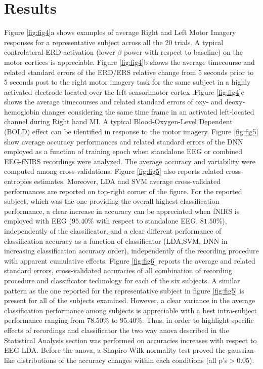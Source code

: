 \documentclass[12pt ]{iopart}
\begin{document}
\section{Results}
Figure \ref{fig:fig4}a shows examples of average Right and Left Motor Imagery responses for a representative subject across all the 20 trials.
A typical controlateral ERD activation (lower $\beta$ power with respect to baseline) on the motor cortices is appreciable.
Figure \ref{fig:fig4}b shows the average timecourse and related standard errors of the ERD/ERS relative change from 5 seconds prior to 5 seconds post to the right motor imagery task for the same subject in a highly activated electrode located over the left sensorimotor cortex .Figure \ref{fig:fig4}c shows the average timecourses and related standard errors of oxy- and deoxy-hemoglobin changes considering the same time frame in an activated left-located channel during Right hand MI. A typical Blood-Oxygen-Level Dependent (BOLD) effect can be identified in response to the motor imagery. 
Figure \ref{fig:fig5} show average accuracy performances and related standard errors
of the DNN employed as a function of training epoch when standalone EEG or combined EEG-fNIRS recordings were analyzed. The average accuracy and variability were computed among cross-validations. 
Figure \ref{fig:fig5} also reports related cross-entropies estimates.
Moreover, LDA and SVM average cross-validated performances are reported on top-right corner of the figure.
For the reported subject, which was the one providing the overall highest classification performance, a clear increase in accuracy can be appreciated when fNIRS is employed with EEG ($95.40\%$ with respect to standalone EEG, $81.50\%$), independently of the classificator, and a clear different performance of classification accuracy as a function of classificator (LDA,SVM, DNN in increasing classification accuracy order), independently of the recording procedure with apparent cumulative effects.
Figure \ref{fig:fig6} reports the average and related standard errors, cross-validated accuracies of all combination of recording procedure and classificator technology for each of the six subjects. A similar pattern as the one reported for the representative subject in figure \ref{fig:fig5} is present for all of the subjects examined.
However, a clear variance in the average classification performance among subjects is appreciable with a best intra-subject performance ranging from $78.50\%$ to $95.40\%$. 
Thus, in order to highlight specific effects of recordings and classificator the two way anova described in the Statistical Analysis section was performed on accuracies increases with respect to EEG-LDA. Before the anova, a Shapiro-Wilk normality test proved the gaussian-like distributions of the accuracy changes within each conditions (all p's$>$0.05).
\end{document}
